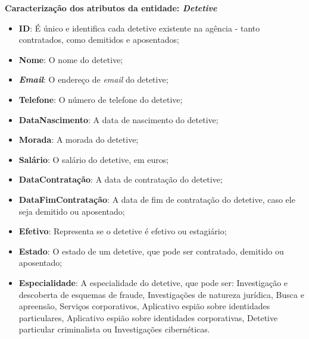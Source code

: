 \documentclass[a4paper,12pt]{scrreprt}
\begin{document}
        \textbf{Caracterização dos atributos da entidade: \textit{Detetive}}
        \begin{itemize}
            \item \textbf{ID}: É único e identifica cada detetive existente na agência - tanto contratados, como demitidos e aposentados;
            \item \textbf{Nome}: O nome do detetive;
            \item \textbf{\textit{Email}}: O endereço de \textit{email} do detetive;
            \item \textbf{Telefone}: O número de telefone do detetive;
            \item \textbf{DataNascimento}: A data de nascimento do detetive;
            \item \textbf{Morada}: A morada do detetive;
            \item \textbf{Salário}: O salário do detetive, em euros;
            \item \textbf{DataContratação}: A data de contratação do detetive;
            \item \textbf{DataFimContratação}: A data de fim de contratação do detetive, caso ele seja demitido ou aposentado;
            \item \textbf{Efetivo}: Representa se o detetive é efetivo ou estagiário;
            \item \textbf{Estado}: O estado de um detetive, que pode ser contratado, demitido ou aposentado;
            \item \textbf{Especialidade}: A especialidade do detetive, que pode ser: Investigação e descoberta de esquemas de fraude, Investigações de natureza jurídica, Busca e apreensão, Serviços corporativos, Aplicativo espião sobre identidades particulares, Aplicativo espião sobre identidades corporativas, Detetive particular criminalista ou Investigações cibernéticas. 
        \end{itemize}

\end{document}
